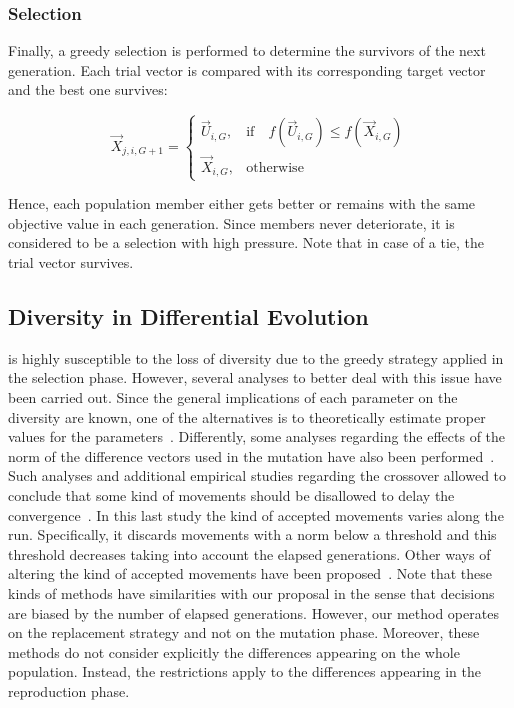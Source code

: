 \subsubsection{Selection}
Finally, a greedy selection is performed to determine the survivors of the next generation.
%
Each trial vector is compared with its corresponding target vector and the best one survives:

\begin{equation} \label{eqn:selection}
\vec{X}_{j,i,G+1}= 
\begin{cases}
    \vec{U}_{i,G},& \text{if} \quad f(\vec{U}_{i,G}) \leq f(\vec{X}_{i,G})  \\
    \vec{X}_{i,G},              & \text{otherwise}
\end{cases}
\end{equation}

Hence, each population member either gets better or remains with the same objective value in each generation.
%
Since members never deteriorate, it is considered to be a selection with high pressure.
%
Note that in case of a tie, the trial vector survives.

%

\subsection{Diversity in Differential Evolution}

\DE{} is highly susceptible to the loss of diversity due to the greedy strategy applied in the selection phase.
%
However, several analyses to better deal with this issue have been carried out.
%
Since the general implications of each \DE{} parameter on the diversity are known, one of
the alternatives is to theoretically estimate proper values for the \DE{} parameters~\cite{zaharie2003control}.
%
Differently, some analyses regarding the effects of the norm of the difference vectors used in the mutation
have also been performed~\cite{montgomery2009differential}.
%
Such analyses and additional empirical studies regarding the crossover allowed to conclude that some kind of movements 
should be disallowed to delay the convergence~\cite{montgomery2012simple}.
%
In this last study the kind of accepted movements varies along the run.
%
Specifically, it discards movements with a norm below a threshold and this threshold decreases taking into account the elapsed generations.
%
Other ways of altering the kind of accepted movements have been proposed~\cite{bolufe2013differential}.
%
Note that these kinds of methods have similarities with our proposal in the sense that decisions are biased by the number of elapsed generations.
%
However, our method operates on the replacement strategy and not on the mutation phase.
%
Moreover, these methods do not consider explicitly the differences appearing on the whole population.
%
Instead, the restrictions apply to the differences appearing in the reproduction phase.

